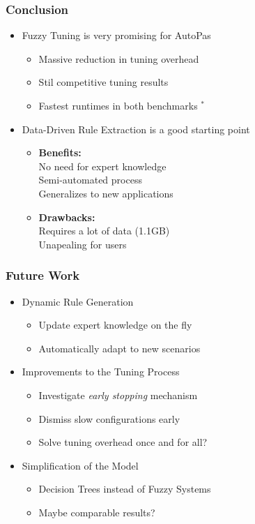 \documentclass[
	10pt,
	t		%
]{beamer}
\newcommand{\xmark}{\ding{55}}%
\newcommand{\cmark}{\ding{51}}%
\begin{document}
\begin{frame}
	\frametitle{Conclusion}
	\begin{itemize}
		\item Fuzzy Tuning is very promising for AutoPas
		      \begin{itemize}
			      \item Massive reduction in tuning overhead
			      \item Stil competitive tuning results
			      \item Fastest runtimes in both benchmarks $^\ast$
		      \end{itemize}
		      \pause
		\item Data-Driven Rule Extraction is a good starting point
		      \begin{itemize}
			      \item \textbf{Benefits:}\\
			            \quad \cmark \; No need for expert knowledge\\
			            \quad \cmark \; Semi-automated process\\
			            \quad \cmark \; Generalizes to new applications\\
			      \item \textbf{Drawbacks:}\\
			            \quad \xmark \; Requires a lot of data (1.1GB) \\
			            \quad \xmark \; Unapealing for users \\
		      \end{itemize}
		      
	\end{itemize}
\end{frame}


\begin{frame}
	\frametitle{Future Work}
	\begin{itemize}
		\item Dynamic Rule Generation
		      \begin{itemize}
			      \item Update expert knowledge on the fly
			      \item Automatically adapt to new scenarios
		      \end{itemize}
		\item Improvements to the Tuning Process
		      \begin{itemize}
			      \item Investigate \textit{early stopping} mechanism
			      \item Dismiss slow configurations early
			      \item Solve tuning overhead once and for all?
		      \end{itemize}
		\item Simplification of the Model
		      \begin{itemize}
			      \item Decision Trees instead of Fuzzy Systems
			      \item Maybe comparable results?
		      \end{itemize}
	\end{itemize}
\end{frame}
\end{document}
